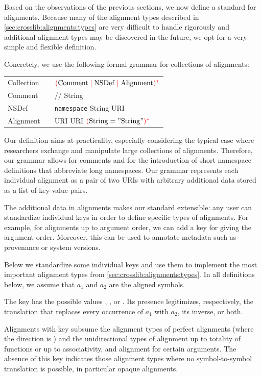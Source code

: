 Based on the observations of the previous sections, we now define a standard for alignments.
Because many of the alignment types described in \autoref{sec:crosslib:alignments:types} are very difficult to handle rigorously and additional alignment types may be discovered in the future, we opt for a very simple and flexible definition.

Concretely, we use the following formal grammar for collections of alignments:
\begin{center}
\begin{tabular}{l@{\tb}c@{\tb}l}
	Collection  & \bbc  & ${\color{red}(}\mathrm{Comment} \;{\color{red}|}\; \mathrm{NSDef} \;{\color{red}|}\; \mathrm{Alignment}{\color{red})}^{{\color{red}\ast}}$\\
	Comment & \bbc & // String \\
	NSDef & \bbc  &\texttt{namespace} String URI\\
	Alignment & \bbc & URI URI ${\color{red}(}\mathrm{String} = "\mathrm{String}"{\color{red})}^{{\color{red}\ast}}$
\end{tabular}
\end{center}
Our definition aims at practicality, especially considering the typical case where researchers exchange and manipulate large collections of alignments.
Therefore, our grammar allows for comments and for the introduction of short namespace definitions that abbreviate long namespaces.
Our grammar represents each individual alignment as a pair of two URIs with arbitrary additional data stored as a list of key-value pairs.

The additional data in alignments makes our standard extensible: any user can standardize individual keys in order to define specific types of alignments.
For example, for alignments up to argument order, we can add a key for giving the argument order.
Moreover, this can be used to annotate metadata such as provenance or system versions.

Below we standardize some individual keys and use them to implement the most important alignment types from \autoref{sec:crosslib:alignments:types}.
In all definitions below, we assume that $a_1$ and $a_2$ are the aligned symbols.

\begin{definition}
The key  has the possible values , , or .
Its presence legitimizes, respectively, the translation that replaces every occurrence of $a_1$ with $a_2$, its inverse, or both.
\end{definition}
Alignments with  key subsume the alignment types of perfect alignments (where the direction is ) and the unidirectional types of alignment up to totality of functions or up to associativity, and alignment for certain arguments.
The absence of this key indicates those alignment types where no symbol-to-symbol translation is possible, in particular opaque alignments.

